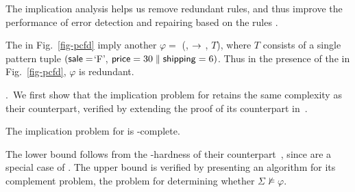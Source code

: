 The implication analysis helps us
remove redundant rules, and thus improve the
performance of error detection and repairing based on
the rules \cite{CFDs,tcs-CINDs}.

\begin{example}
\label{exa-implication} The \pCFDs in Fig.~\ref{fig-pcfd} imply
another \pCFD $\varphi =$ (,  $\rightarrow$
, $T$), where $T$ consists of a single pattern tuple
$(\protect\mathsf{sale} = $`F', $\protect\mathsf{price} = 30 \parallel \protect\mathsf{shipping} = 6)$. Thus
in the presence of the \pCFDs in Fig.~\ref{fig-pcfd}, $\varphi$ is
redundant. 
\end{example}
\vspace{-1ex}

.~We first show that
the implication problem for \pCFDs retains
the same complexity as their \CFDs counterpart, verified by
extending the proof of its counterpart in~\cite{CFDs}.

\begin{prop}
\label{thm-imp-pcfd-fin}The implication problem for \pCFDs is
\coNP-complete. \eop
\end{prop}
\vspace{-1ex}

\proofs The lower bound follows from the
\coNP-hardness of their \CFDs counterpart~\cite{CFDs}, since \CFDs
are a special case of \pCFDs. The \coNP upper bound is verified
by presenting an \NP algorithm for its complement problem, \ie
the problem for determining whether $\Sigma\not\models\varphi$. \eop

